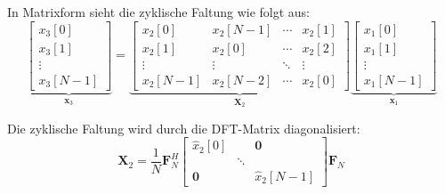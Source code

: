 \documentclass[11pt]{article}
\begin{document}
In Matrixform sieht die zyklische Faltung wie folgt aus:
$$\underbrace{\begin{bmatrix}
    x_3[0] \\
    x_3[1] \\
    \vdots \\
    x_3[N-1]
\end{bmatrix}}_{\mathbf{x}_3} = \underbrace{\begin{bmatrix}
    x_2[0] & x_2[N-1] & \cdots & x_2[1] \\
    x_2[1] & x_2[0] & \cdots & x_2[2] \\
    \vdots & \vdots & \ddots & \vdots \\
    x_2[N-1] & x_2[N-2] & \cdots & x_2[0]
\end{bmatrix}}_{\mathbf{X}_2} \underbrace{\begin{bmatrix}
    x_1[0] \\
    x_1[1] \\
    \vdots \\
    x_1[N-1]
\end{bmatrix}}_{\mathbf{x}_1}$$

\vspace*{-0.5cm}
Die zyklische Faltung wird durch die DFT-Matrix diagonalisiert:
$$\mathbf{X}_2 = \frac{1}{N} \mathbf{F}_N^H  \begin{bmatrix}
    \hat{x}_2[0] & & \mathbf{0} \\
    & \ddots & \\
    \mathbf{0} & & \hat{x}_2[N-1]
\end{bmatrix}   \mathbf{F}_N $$

\vspace*{-0.75cm}
\end{document}
